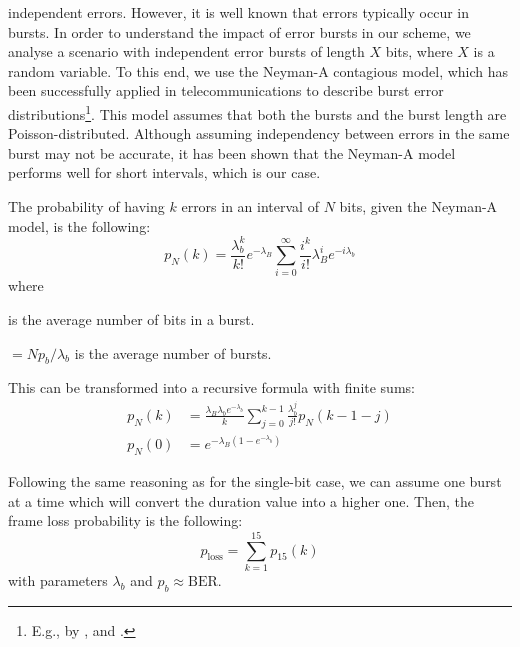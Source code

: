 \documentclass[twoside,nohyper]{tufte-book}
\providecommand{\tightlist}{%
  \setlength{\itemsep}{0pt}\setlength{\parskip}{0pt}}
\theoremstyle{definition}
\theoremstyle{definition}
\theoremstyle{definition}
\theoremstyle{remark}
\begin{document}
 independent errors. However, it is
well known that errors typically occur in bursts. In order to understand
the impact of error bursts in our scheme, we analyse a scenario with
independent error bursts of length \(X\) bits, where \(X\) is a random
variable. To this end, we use the Neyman-A contagious
model\cite[-10mm]{neyman1939new},
which has been successfully applied in telecommunications to describe
burst error distributions\footnote{E.g., by \citet{s614},
  \citet{becam1985validite} and \citet{irvin1991monitoring}.}. This
model assumes that both the bursts and the burst length are
Poisson-distributed. Although assuming independency between errors in
the same burst may not be accurate, it has been shown that the Neyman-A
model performs well for short
intervals\cite[0pt]{cornaglia1996letter},
which is our case.

The probability of having \(k\) errors in an interval of \(N\) bits,
given the Neyman-A model, is the following:
%
\begin{equation}
 p_N(k) = \frac{\lambda_b^k}{k!}e^{-\lambda_B}\sum_{i=0}^\infty\frac{i^k}{i!}\lambda_B^i e^{-i\lambda_b}
 \label{eq:pNk}
\end{equation}
%
where

\begin{description}
\tightlist
\item[\(\lambda_b\)]
is the average number of bits in a burst.
\item[\(\lambda_B\)]
\(= Np_b/\lambda_b\) is the average number of bursts.
\end{description}

This can be transformed into a recursive formula with finite sums:
%
\begin{equation}
\begin{split}
 p_N(k) &= \frac{\lambda_B\lambda_b e^{-\lambda_b}}{k}\sum_{j=0}^{k-1} \frac{\lambda_b^j}{j!}p_N(k-1-j) \\
 p_N(0) &= e^{-\lambda_B\left(1-e^{-\lambda_b}\right)} 
\end{split}
\label{eq:pN0}
\end{equation}
%


Following the same reasoning as for the single-bit case, we can assume
one burst at a time which will convert the duration value into a higher
one. Then, the frame loss probability is the following:
%
\begin{equation}
 p_{\mathrm{loss}} = \sum_{k=1}^{15} p_{15}(k)
 \label{eq:plossburst}
\end{equation}
%
with parameters \(\lambda_b\) and \(p_b \approx \mathrm{BER}\).
\end{document}
